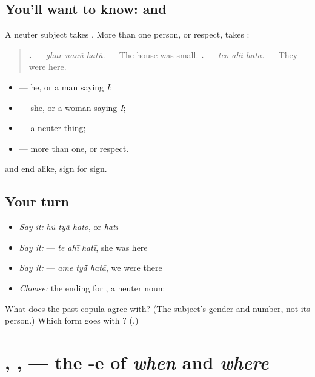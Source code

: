 \subsection*{You'll want to know:  and }
A neuter subject takes \textbf{}. More than one person, or respect, takes \textbf{}:

\begin{quote}
\textbf{  .} — \emph{ghar nānũ hatũ.} — The house was small. \textbf{  .} — \emph{teo ahī̃ hatā.} — They were here.
\end{quote}

\begin{itemize}
\raggedright
  \item \textbf{} — he, or a man saying \emph{I};
  \item \textbf{} — she, or a woman saying \emph{I};
  \item \textbf{} — a neuter thing;
  \item \textbf{} — more than one, or respect.
\end{itemize}

\textbf{   } and \textbf{   } end alike, sign for sign.

\subsection*{Your turn}
\begin{itemize}
\raggedright
  \item \emph{Say it:} \emph{hũ tyā̃ hato}, or \emph{hatī}
  \item \emph{Say it:} \textbf{  } — \emph{te ahī̃ hatī}, she was here
  \item \emph{Say it:} \textbf{  } — \emph{ame tyā̃ hatā}, we were there
  \item \emph{Choose:} the ending for \textbf{}, a neuter noun: \textbf{  }
\end{itemize}

\begin{tcolorbox}[breakable,colback=teal!4,colframe=teal!35!black,title={Before you move on}]
What does the past copula agree with? (The subject's gender and number, not its person.) Which form goes with \textbf{}? (\textbf{}.)
\end{tcolorbox}
\section[\texorpdfstring{\gu{ગઈકાલે} · \gu{સવારે} · \gu{ઘરે} (gaīkāle · savāre …)}{ગઈકાલે · સવારે · ઘરે (gaīkāle · savāre …)}]{, ,  — the -e of \emph{when} and \emph{where}}

